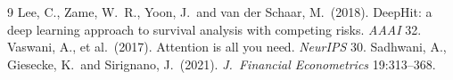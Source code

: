\documentclass[11pt,a4paper]{article}
\begin{document}
\begin{thebibliography}{9}
\small
{}Lee, C., Zame, W.\ R., Yoon, J.\ and van der Schaar, M.\ (2018). DeepHit: a deep learning approach to survival analysis with competing risks. \textit{AAAI} 32.
Vaswani, A., et al.\ (2017). Attention is all you need. \textit{NeurIPS} 30.
Sadhwani, A., Giesecke, K.\ and Sirignano, J.\ (2021). \textit{J.\ Financial Econometrics} 19:313--368.
\end{thebibliography}
\end{document}

